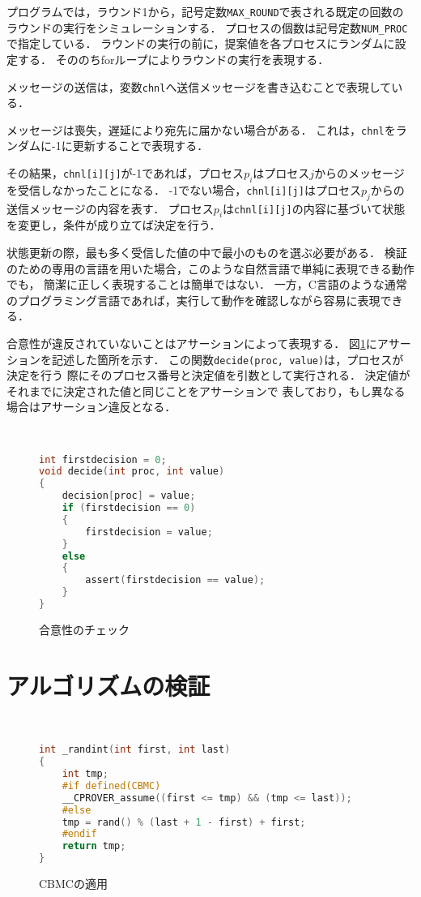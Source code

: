 \documentclass[technicalreport]{ieicej}
\theoremstyle{plain}
\begin{document}
プログラムでは，ラウンド1から，記号定数\verb|MAX_ROUND|で表される既定の回数のラウンドの実行をシミュレーションする．
プロセスの個数は記号定数\verb|NUM_PROC|で指定している．
ラウンドの実行の前に，提案値を各プロセスにランダムに設定する．
そののちforループによりラウンドの実行を表現する．

メッセージの送信は，変数\verb|chnl|へ送信メッセージを書き込むことで表現している．

メッセージは喪失，遅延により宛先に届かない場合がある．
これは，\verb|chnl|をランダムに-1に更新することで表現する．

その結果，\verb|chnl[i][j]|が-1であれば，プロセス$p_i$はプロセス$j$からのメッセージを受信しなかったことになる．
-1でない場合，\verb|chnl[i][j]|はプロセス$p_j$からの送信メッセージの内容を表す．
プロセス$p_i$は\verb|chnl[i][j]|の内容に基づいて状態を変更し，条件が成り立てば決定を行う．

状態更新の際，最も多く受信した値の中で最小のものを選ぶ必要がある．
検証のための専用の言語を用いた場合，このような自然言語で単純に表現できる動作でも，
簡潔に正しく表現することは簡単ではない．
一方，C言語のような通常のプログラミング言語であれば，実行して動作を確認しながら容易に表現できる．

合意性が違反されていないことはアサーションによって表現する．
図\ref{fig:assert}にアサーションを記述した箇所を示す．
この関数\verb|decide(proc, value)|は，プロセスが決定を行う
際にそのプロセス番号と決定値を引数として実行される．
決定値がそれまでに決定された値と同じことをアサーションで
表しており，もし異なる場合はアサーション違反となる．

\begin{figure}[t]
\centering　{\scriptsize
	\begin{lstlisting}[language=c]
int firstdecision = 0;
void decide(int proc, int value) 
{
	decision[proc] = value;
	if (firstdecision == 0)
	{
		firstdecision = value;
	}
	else
	{
		assert(firstdecision == value);
	}
}
\end{lstlisting}}
\caption{合意性のチェック}\label{fig:assert}
\end{figure}          


\section{アルゴリズムの検証}\label{sec:cmbc}
\begin{figure}[t]
    \centering　{\scriptsize
\begin{lstlisting}[language=c]
int _randint(int first, int last)
{
    int tmp;
    #if defined(CBMC)
    __CPROVER_assume((first <= tmp) && (tmp <= last));
    #else
    tmp = rand() % (last + 1 - first) + first;
    #endif
    return tmp;
}
\end{lstlisting}}

        \caption{CBMCの適用}\label{fig:cbmc}
    \end{figure}          
 
\end{document}
